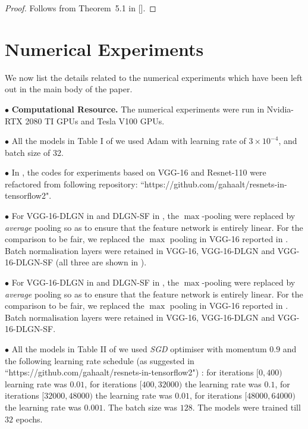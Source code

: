 \begin{proof}
Follows from Theorem~5.1 in [].
\end{proof}


\section{Numerical Experiments}
We now list the details related to the numerical experiments which have been left out in the main body of the paper.

 $\bullet$ \textbf{Computational Resource.} The numerical experiments were run in Nvidia-RTX 2080 TI GPUs and Tesla V100 GPUs.

$\bullet$ All the models in Table I of  we used Adam \citep{adam} with learning rate of $3\times 10^{-4}$, and batch size of 32.

$\bullet$ In , the codes for experiments based on VGG-16 and Resnet-110  were refactored from following repository: ``https://github.com/gahaalt/resnets-in-tensorflow2".

$\bullet$ For VGG-16-DLGN in  and DLGN-SF in , the $\max$-pooling were replaced by \emph{average} pooling so as to ensure that the feature network is entirely linear. For the comparison to be fair, we replaced the $\max$ pooling in VGG-16 reported in . Batch normalisation layers were retained in VGG-16, VGG-16-DLGN and VGG-16-DLGN-SF (all three are shown in ).


$\bullet$ For VGG-16-DLGN in  and DLGN-SF in , the $\max$-pooling were replaced by \emph{average} pooling so as to ensure that the feature network is entirely linear. For the comparison to be fair, we replaced the $\max$ pooling in VGG-16 reported in . Batch normalisation layers were retained in VGG-16, VGG-16-DLGN and VGG-16-DLGN-SF.

$\bullet$ All the models in Table II of  we used \emph{SGD} optimiser with momentum $0.9$ and the following learning rate schedule (as suggested in ``https://github.com/gahaalt/resnets-in-tensorflow2") : for iterations $[0, 400)$ learning rate was $0.01$,  for iterations $[400, 32000)$ the learning rate was $ 0.1$, for iterations $[32000, 48000)$ the learning rate was $0.01$, for iterations $[48000, 64000)$ the learning rate was $0.001$. The batch size was $128$. The models were trained till $32$ epochs.

